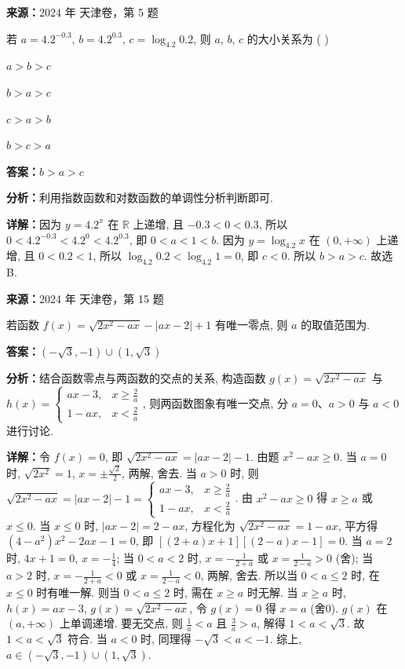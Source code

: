 \begin{question}[points=5]
\textbf{来源：}2024 年 天津卷，第 5 题\par
若 $a = 4.2^{-0.3}$, $b = 4.2^{0.3}$, $c = \log_{4.2}{0.2}$, 则 $a$, $b$, $c$ 的大小关系为 ( )
\begin{choices}
  \item $a > b > c$
  \item $b > a > c$
  \item $c > a > b$
  \item $b > c > a$
\end{choices}
\begin{solution}
\textbf{答案：}$b > a > c$

\textbf{分析：}利用指数函数和对数函数的单调性分析判断即可.

\textbf{详解：}因为 $y=4.2^x$ 在 $\mathbb{R}$ 上递增, 且 $-0.3<0<0.3$, 所以 $0<4.2^{-0.3}<4.2^0<4.2^{0.3}$, 即 $0<a<1<b$. 因为 $y=\log_{4.2}x$ 在 $(0,+\infty)$ 上递增, 且 $0<0.2<1$, 所以 $\log_{4.2}{0.2}<\log_{4.2}{1}=0$, 即 $c<0$. 所以 $b>a>c$. 故选 B.
\end{solution}
\end{question}

\begin{question}[points=5]
\textbf{来源：}2024 年 天津卷，第 15 题\par
若函数 $f(x)=\sqrt{2x^2-ax} - |ax-2| + 1$ 有唯一零点, 则 $a$ 的取值范围为.
\begin{solution}
\textbf{答案：}$(-\sqrt{3},-1)\cup(1,\sqrt{3})$

\textbf{分析：}结合函数零点与两函数的交点的关系, 构造函数 $g(x)=\sqrt{2x^2-ax}$ 与 $h(x)=\begin{cases} ax-3, & x\geq\frac{2}{a} \\ 1-ax, & x<\frac{2}{a} \end{cases}$, 则两函数图象有唯一交点, 分 $a=0$、$a>0$ 与 $a<0$ 进行讨论.

\textbf{详解：}令 $f(x)=0$, 即 $\sqrt{2x^2-ax}=|ax-2|-1$. 由题 $x^2-ax\geq0$. 当 $a=0$ 时, $\sqrt{2x^2}=1$, $x=\pm\frac{\sqrt{2}}{2}$, 两解, 舍去. 当 $a>0$ 时, 则 $\sqrt{2x^2-ax}=|ax-2|-1=\begin{cases} ax-3, & x\geq\frac{2}{a}\\ 1-ax, & x<\frac{2}{a} \end{cases}$. 由 $x^2-ax\geq0$ 得 $x\geq a$ 或 $x\leq0$. 当 $x\leq0$ 时, $|ax-2|=2-ax$, 方程化为 $\sqrt{2x^2-ax}=1-ax$, 平方得 $(4-a^2)x^2-2ax-1=0$, 即 $[(2+a)x+1][(2-a)x-1]=0$. 当 $a=2$ 时, $4x+1=0$, $x=-\frac{1}{4}$; 当 $0<a<2$ 时, $x=-\frac{1}{2+a}$ 或 $x=\frac{1}{2-a}>0$ (舍); 当 $a>2$ 时, $x=-\frac{1}{2+a}<0$ 或 $x=\frac{1}{2-a}<0$, 两解, 舍去. 所以当 $0<a\leq2$ 时, 在 $x\leq0$ 时有唯一解. 则当 $0<a\leq2$ 时, 需在 $x\geq a$ 时无解. 当 $x\geq a$ 时, $h(x)=ax-3$, $g(x)=\sqrt{2x^2-ax}$, 令 $g(x)=0$ 得 $x=a$ (舍0). $g(x)$ 在 $(a,+\infty)$ 上单调递增. 要无交点, 则 $\frac{1}{a}<a$ 且 $\frac{3}{a}>a$, 解得 $1<a<\sqrt{3}$. 故 $1<a<\sqrt{3}$ 符合. 当 $a<0$ 时, 同理得 $-\sqrt{3}<a<-1$. 综上, $a\in(-\sqrt{3},-1)\cup(1,\sqrt{3})$.
\end{solution}
\end{question}

